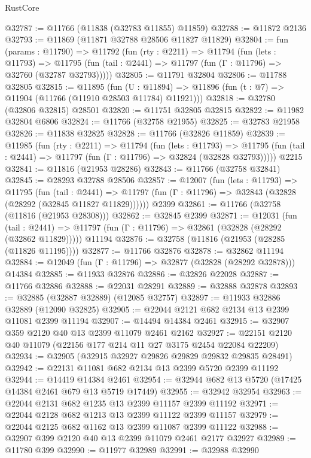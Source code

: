 \begin{lexlean}{RustCore}
\begin{coremodule}
@32787 := @11766 (@11838 (@32783 @11855) @11859)
@32788 := @11872 @2136
@32793 := @11869 (@11871 @32788 @28506 @11827 @11829)
@32804 := fun (params : @11790) =>
  @11792
    (fun (rty : @2211) =>
    @11794
      (fun (lets : @11793) =>
      @11795 (fun (tail : @2441) => @11797 (fun (Γ : @11796) => @32760 (@32787 @32793)))))
@32805 := @11791 @32804
@32806 := @11788 @32805
@32815 := @11895
    (fun (U : @11894) => @11896 (fun (t : @7) => @11904 (@11766 (@11910 @28503 @11784) @11921)))
@32818 := @32780 (@32806 @32815) @28501
@32820 := @11751 @32805 @32815
@32822 := @11982 @32804 @6806
@32824 := @11766 (@32758 @21955)
@32825 := @32783 @21958
@32826 := @11838 @32825
@32828 := @11766 (@32826 @11859)
@32839 := @11985
    (fun (rty : @2211) =>
    @11794
      (fun (lets : @11793) =>
      @11795 (fun (tail : @2441) => @11797 (fun (Γ : @11796) => @32824 (@32828 @32793)))))
    @2215
@32841 := @11816 (@21953 @28286)
@32843 := @11766 (@32758 @32841)
@32845 := @28293 @32788 @28506
@32857 := @12007
    (fun (lets : @11793) =>
    @11795
      (fun (tail : @2441) =>
      @11797 (fun (Γ : @11796) => @32843 (@32828 (@28292 (@32845 @11827 @11829))))))
    @2399
@32861 := @11766 (@32758 (@11816 (@21953 @28308)))
@32862 := @32845 @2399
@32871 := @12031
    (fun (tail : @2441) => @11797 (fun (Γ : @11796) => @32861 (@32828 (@28292 (@32862 @11829)))))
    @11194
@32876 := @32758 (@11816 (@21953 (@28285 (@11826 @11195))))
@32877 := @11766 @32876
@32878 := @32862 @11194
@32884 := @12049 (fun (Γ : @11796) => @32877 (@32828 (@28292 @32878))) @14384
@32885 := @11933 @32876
@32886 := @32826 @22028
@32887 := @11766 @32886
@32888 := @22031 @28291
@32889 := @32888 @32878
@32893 := @32885 (@32887 @32889) (@12085 @32757)
@32897 := @11933 @32886 @32889 (@12090 @32825)
@32905 := @22044 @2121 @682 @2134 @13 @2399 @11081 @2399 @11194
@32907 := @14494 @14384 @2461
@32915 := @32907 @359 @2120 @40 @13 @2399 @11079 @2461 @2162
@32927 := @22151 @2120 @40 @11079 (@22156 @177 @214 @11 @27 @3175 @2454 @22084 @22209)
@32934 := @32905 (@32915 @32927 @29826 @29829 @29832 @29835 @28491)
@32942 := @22131 @11081 @682 @2134 @13 @2399 @5720 @2399 @11192
@32944 := @14419 @14384 @2461
@32954 := @32944 @682 @13 @5720 (@17425 @14384 @2461 @679 @13 @5719 @17449)
@32955 := @32942 @32954
@32963 := @22044 @2131 @682 @1235 @13 @2399 @11157 @2399 @11192
@32971 := @22044 @2128 @682 @1213 @13 @2399 @11122 @2399 @11157
@32979 := @22044 @2125 @682 @1162 @13 @2399 @11087 @2399 @11122
@32988 := @32907 @399 @2120 @40 @13 @2399 @11079 @2461 @2177 @32927
@32989 := @11780 @399
@32990 := @11977 @32989
@32991 := @32988 @32990

\end{coremodule}
\end{lexlean}
